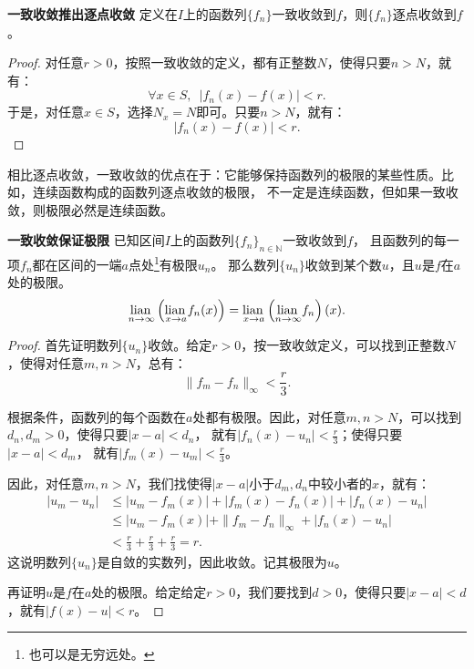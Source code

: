 \documentclass[12pt,UTF8,fontset=none]{ctexbook}
\begin{document}
\begin{appendix}
\begin{tm}{\textbf{一致收敛推出逐点收敛}}
    定义在$I$上的函数列$\{f_n\}$一致收敛到$f$，则$\{f_n\}$逐点收敛到$f$。
\end{tm}

\begin{proof}
    对任意$r>0$，按照一致收敛的定义，都有正整数$N$，使得只要$n>N$，就有：
    $$ \forall x\in S, \,\,\,|f_n(x) - f(x) | < r.$$
    于是，对任意$x\in S$，选择$N_x = N$即可。只要$n>N$，就有：
    $$ |f_n(x) - f(x) | < r.$$
\end{proof}

相比逐点收敛，一致收敛的优点在于：它能够保持函数列的极限的某些性质。比如，连续函数构成的函数列逐点收敛的极限，
不一定是连续函数，但如果一致收敛，则极限必然是连续函数。

\begin{tm}{\textbf{一致收敛保证极限}}
    已知区间$I$上的函数列$\{f_n\}_{n\in\mathbb{N}}$一致收敛到$f$，
    且函数列的每一项$f_n$都在区间的一端$a$点处\footnote{也可以是无穷远处。}有极限$u_n$。
    那么数列$\{u_n\}$收敛到某个数$u$，且$u$是$f$在$a$处的极限。
    $$ \underset{n\to \infty}{\operatorname{lian}\,} \left(\underset{x\to a}{\operatorname{lian}\,} f_n(x) \right) = \underset{x\to a}{\operatorname{lian}\,} \left(\underset{n\to \infty}{\operatorname{lian}\,} f_n\right)(x). $$
\end{tm}

\begin{proof}
    首先证明数列$\{u_n\}$收敛。给定$r>0$，按一致收敛定义，可以找到正整数$N$，使得对任意$m,n>N$，总有：
    $$ \| f_m - f_n\|_{\infty} < \frac{r}{3}.$$

    根据条件，函数列的每个函数在$a$处都有极限。因此，对任意$m,n>N$，可以找到$d_n, d_m > 0$，使得只要$|x - a| < d_n$，
    就有$|f_n(x) - u_n| < \frac{r}{3}$；使得只要$|x - a| < d_m$，
    就有$|f_m(x) - u_m| < \frac{r}{3}$。

    因此，对任意$m,n>N$，我们找使得$|x - a|$小于$d_m, d_n$中较小者的$x$，就有：
    \begin{align*}
        |u_m - u_n| &\leqslant |u_m - f_m(x)| + |f_m(x) - f_n(x)| + |f_n(x) - u_n| \\
        &\leqslant |u_m - f_m(x)| + \| f_m - f_n\|_{\infty} + |f_n(x) - u_n| \\
        &< \frac{r}{3} + \frac{r}{3} + \frac{r}{3} = r.
    \end{align*}
    这说明数列$\{u_n\}$是自敛的实数列，因此收敛。记其极限为$u$。

    再证明$u$是$f$在$a$处的极限。给定给定$r>0$，我们要找到$d>0$，使得只要$|x - a| < d$，就有$|f(x) - u| < r$。
    

\end{proof}
\end{appendix}
\end{document}
